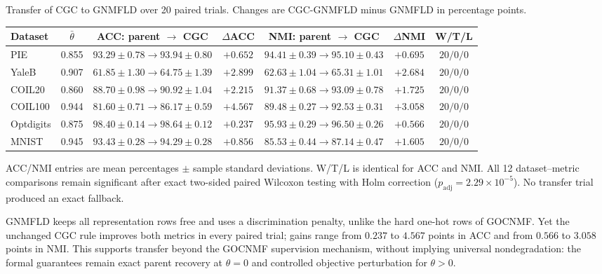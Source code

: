 \documentclass[11pt]{article}
\newenvironment{widetable}
  {\begin{strip}\centering\captionsetup{type=table}}
  {\end{strip}}
\theoremstyle{remark}
\begin{document}
\begin{widetable}
\centering
\caption{Transfer of CGC to GNMFLD over 20 paired trials. Changes are CGC-GNMFLD minus GNMFLD in percentage points.}
\label{tab:cgc_gnmfld_transfer}
\small
\setlength{\tabcolsep}{9.3pt}
\begin{tabular}{lcccccc}
\toprule
Dataset & $\bar\theta$ & ACC: parent $\rightarrow$ CGC & $\Delta$ACC &
NMI: parent $\rightarrow$ CGC & $\Delta$NMI & W/T/L \\
\midrule
PIE       & 0.855 & $93.29\pm0.78\rightarrow93.94\pm0.80$ & $+0.652$ & $94.41\pm0.39\rightarrow95.10\pm0.43$ & $+0.695$ & $20/0/0$ \\
YaleB     & 0.907 & $61.85\pm1.30\rightarrow64.75\pm1.39$ & $+2.899$ & $62.63\pm1.04\rightarrow65.31\pm1.01$ & $+2.684$ & $20/0/0$ \\
COIL20    & 0.860 & $88.70\pm0.98\rightarrow90.92\pm1.04$ & $+2.215$ & $91.37\pm0.68\rightarrow93.09\pm0.78$ & $+1.725$ & $20/0/0$ \\
COIL100   & 0.944 & $81.60\pm0.71\rightarrow86.17\pm0.59$ & $+4.567$ & $89.48\pm0.27\rightarrow92.53\pm0.31$ & $+3.058$ & $20/0/0$ \\
Optdigits & 0.875 & $98.40\pm0.14\rightarrow98.64\pm0.12$ & $+0.237$ & $95.93\pm0.29\rightarrow96.50\pm0.26$ & $+0.566$ & $20/0/0$ \\
MNIST     & 0.945 & $93.43\pm0.28\rightarrow94.29\pm0.28$ & $+0.856$ & $85.53\pm0.44\rightarrow87.14\pm0.47$ & $+1.605$ & $20/0/0$ \\
\bottomrule
\end{tabular}%

\vspace{1mm}
\parbox{0.98\linewidth}{\footnotesize ACC/NMI entries are mean percentages $\pm$ sample standard deviations. W/T/L is identical for ACC and NMI. All 12 dataset--metric comparisons remain significant after exact two-sided paired Wilcoxon testing with Holm correction ($p_{\mathrm{adj}}=2.29\times10^{-5}$). No transfer trial produced an exact fallback.}
\end{widetable}

GNMFLD keeps all representation rows free and uses a discrimination penalty, unlike the hard one-hot rows of GOCNMF. Yet the unchanged CGC rule improves both metrics in every paired trial; gains range from $0.237$ to $4.567$ points in ACC and from $0.566$ to $3.058$ points in NMI. This supports transfer beyond the GOCNMF supervision mechanism, without implying universal nondegradation: the formal guarantees remain exact parent recovery at $\theta=0$ and controlled objective perturbation for $\theta>0$.
\end{document}
